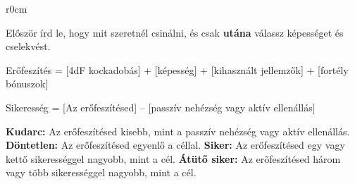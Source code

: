 {
\begin{wraptable}{r}{0cm}
\end{wraptable}


Először írd le, hogy mit szeretnél csinálni, és csak \textbf{utána} válassz képességet és cselekvést.


Erőfeszítés = [4dF kockadobás] + [képesség] + [kihasznált jellemzők] + [fortély bónuszok]


Sikeresség = [Az erőfeszítésed] – [passzív nehézség vagy aktív ellenállás]

\begin{itemize}
    \failureitem \textbf{Kudarc:} Az erőfeszítésed kisebb, mint a passzív nehézség vagy aktív ellenállás.
    \tieitem \textbf{Döntetlen:} Az erőfeszítésed egyenlő a céllal.
    \successitem \textbf{Siker:} Az erőfeszítésed egy vagy kettő sikerességgel nagyobb, mint a cél.
    \successwithstyleitem \textbf{Átütő siker:} Az erőfeszítésed három vagy több sikerességgel nagyobb, mint a cél.
\end{itemize}
}

\vspace{5pt}

